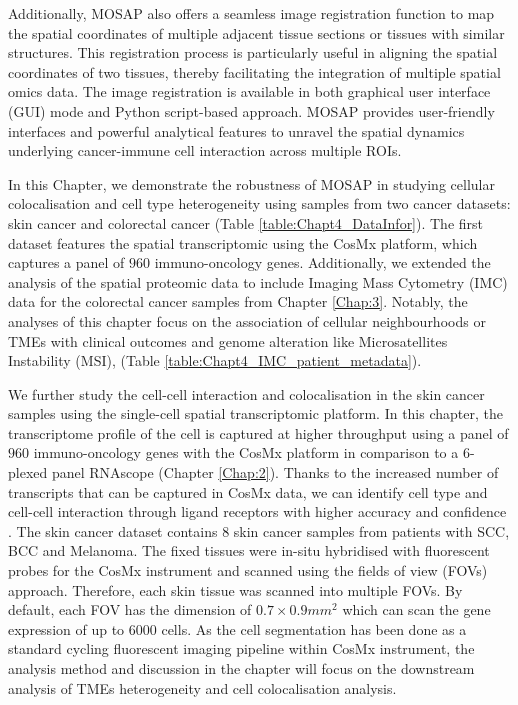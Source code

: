 Additionally, MOSAP also offers a seamless image registration function to map the spatial coordinates of multiple adjacent tissue sections or tissues with similar structures. This registration process is particularly useful in aligning the spatial coordinates of two tissues, thereby facilitating the integration of multiple spatial omics data. The image registration is available in both graphical user interface (GUI) mode and Python script-based approach. MOSAP provides user-friendly interfaces and powerful analytical features to unravel the spatial dynamics underlying cancer-immune cell interaction across multiple ROIs.

In this Chapter, we demonstrate the robustness of MOSAP in studying cellular colocalisation and cell type heterogeneity using samples from two cancer datasets: skin cancer and colorectal cancer (Table \ref{table:Chapt4_DataInfor}). The first dataset features the spatial transcriptomic using the CosMx platform, which captures a panel of $960$ immuno-oncology genes. Additionally, we extended the analysis of the spatial proteomic data to include Imaging Mass Cytometry (IMC) data for the colorectal cancer samples from Chapter \ref{Chap:3}. Notably, the analyses of this chapter focus on the association of cellular neighbourhoods or TMEs with clinical outcomes and genome alteration like Microsatellites Instability (MSI), (Table \ref{table:Chapt4_IMC_patient_metadata}). 

We further study the cell-cell interaction and colocalisation in the skin cancer samples using the single-cell spatial transcriptomic platform. In this chapter, the transcriptome profile of the cell is captured at higher throughput using a panel of $960$ immuno-oncology genes with the CosMx platform in comparison to a 6-plexed panel RNAscope (Chapter \ref{Chap:2}). Thanks to the increased number of transcripts that can be captured in CosMx data, we can identify cell type and cell-cell interaction through ligand receptors with higher accuracy and confidence \cite{he2022high}. The skin cancer dataset contains $8$ skin cancer samples from patients with SCC, BCC and Melanoma. The fixed tissues were in-situ hybridised with fluorescent probes for the CosMx instrument and scanned using the fields of view (FOVs) approach. Therefore, each skin tissue was scanned into multiple FOVs. By default, each FOV has the dimension of $0.7 \times 0.9 mm^{2}$ which can scan the gene expression of up to $6000$ cells. As the cell segmentation has been done as a standard cycling fluorescent imaging pipeline within CosMx instrument, the analysis method and discussion in the chapter will focus on the downstream analysis of TMEs heterogeneity and cell colocalisation analysis.

